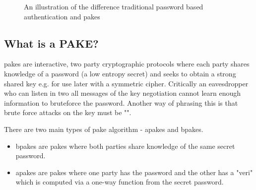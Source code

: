\begin{figure}[H]
  \centering

  \caption{An illustration of the difference traditional password based authentication and \glspl{pake}}
  \label{fig:tls-vs-pake}
\end{figure}

\clearpage
\subsection{What is a PAKE?}
\glspl{pake} are interactive, two party cryptographic protocols where each party shares knowledge of a password (a low entropy secret) and seeks to obtain a strong shared key e.g. for use later with a symmetric cipher. Critically an eavesdropper who can listen in two all messages of the key negotiation cannot learn enough information to bruteforce the password. Another way of phrasing this is that brute force attacks on the key must be "".

There are two main types of \gls{pake} algorithm - \glspl{apake} and \glspl{bpake}.
\begin{itemize}
  \item \glspl{bpake} are \glspl{pake} where both parties share knowledge of the same secret password.
  \item \glspl{apake} are \glspl{pake} where one party has the password and the other has a "\gls{veri}" which is computed via a one-way function from the secret password.
\end{itemize}

